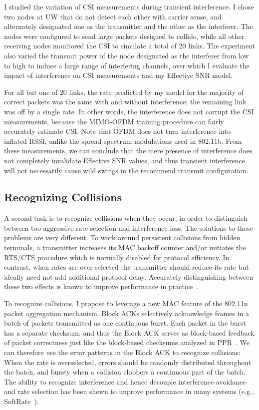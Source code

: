 I studied the variation of CSI measurements during transient interference. I chose two nodes at UW that do not detect each other with carrier sense, and alternately designated one as the transmitter and the other as the interferer. The nodes were configured to send large packets designed to collide, while all other receiving nodes monitored the CSI to simulate a total of 20 links. The experiment also varied the transmit power of the node designated as the interferer from low to high to induce a large range of interfering channels, over which I evaluate the impact of interference on CSI measurements and my Effective SNR model.

For all but one of 20 links, the rate predicted by my model for the majority of correct packets was the same with and without interference; the remaining link was off by a single rate. In other words, the interference does not corrupt the CSI measurements, because the MIMO-OFDM training procedure can fairly accurately estimate CSI. Note that OFDM does not turn interference into inflated RSSI, unlike the spread spectrum modulations used in 802.11b. From these measurements, we can conclude that the mere presence of interference does not completely invalidate Effective SNR values, and thus transient interference will not necessarily cause wild swings in the recommend transmit configuration.

\subsection{Recognizing Collisions}
A second task is to recognize collisions when they occur, in order to distinguish between too-aggressive rate selection and interference loss. The solutions to these problems are very different. To work around persistent collisions from hidden terminals, a transmitter increases its MAC backoff counter and/or initiates the RTS/CTS procedure which is normally disabled for protocol efficiency. In contrast, when rates are over-selected the transmitter should reduce its rate but ideally need not add additional protocol delay. Accurately distinguishing between these two effects is known to improve performance in practice~\cite{Wong_RRAA,Jamieson_PPR,Vutukuru_SoftRate}.

To recognize collisions, I propose to leverage a new MAC feature of the 802.11n packet aggregation mechanism. Block ACKs selectively acknowledge frames in a batch of packets transmitted as one continuous burst. Each packet in the burst has a separate checksum, and thus the Block ACK serves as block-based feedback of packet correctness just like the block-based checksums analyzed in PPR~\cite{Jamieson_PPR}. We can therefore use the error patterns in the Block ACK to recognize collisions: When the rate is overselected, errors should be randomly distributed throughout the batch, and bursty when a collision clobbers a continuous part of the batch. The ability to recognize interference and hence decouple interference avoidance and rate selection has been shown to improve performance in many systems (e.g., SoftRate~\cite{Vutukuru_SoftRate}).

